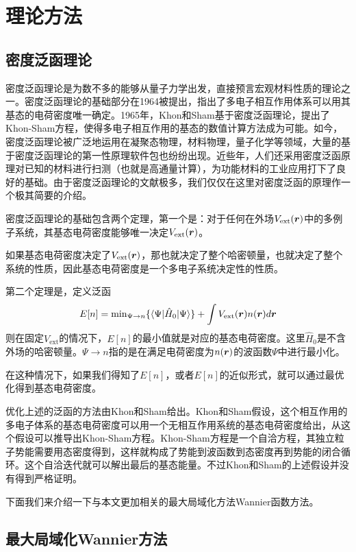 \chapter{理论方法}
\label{cha:method}

\section{密度泛函理论}

密度泛函理论是为数不多的能够从量子力学出发，直接预言宏观材料性质的理论之一。密度泛函理论的基础部分在1964被提出，指出了多电子相互作用体系可以用其基态的电荷密度唯一确定。1965年，Khon和Sham基于密度泛函理论，提出了Khon-Sham方程，使得多电子相互作用的基态的数值计算方法成为可能。如今，密度泛函理论被广泛地运用在凝聚态物理，材料物理，量子化学等领域，大量的基于密度泛函理论的第一性原理软件包也纷纷出现。近些年，人们还采用密度泛函原理对已知的材料进行扫测（也就是高通量计算），为功能材料的工业应用打下了良好的基础。由于密度泛函理论的文献极多，我们仅仅在这里对密度泛函的原理作一个极其简要的介绍。

密度泛函理论的基础包含两个定理，第一个是：对于任何在外场$V_{\text{ext}}(\boldsymbol{r})$中的多例子系统，其基态电荷密度能够唯一决定$V_{\text{ext}}(\boldsymbol{r})$。

如果基态电荷密度决定了$V_{\text{ext}}(\boldsymbol{r})$，那也就决定了整个哈密顿量，也就决定了整个系统的性质，因此基态电荷密度是一个多电子系统决定性的性质。

第二个定理是，定义泛函
\begin{equation}
    E[n] = \text{min}_{\Psi\to n} \{\langle\Psi|\hat{H}_0|\Psi\rangle\}+\int V_\text{ext}(\boldsymbol{r}) n(\boldsymbol{r}) d\boldsymbol{r}
\end{equation}
则在固定$V_\text{ext}$的情况下，$E[n]$的最小值就是对应的基态电荷密度。这里$\hat{H}_0$是不含外场的哈密顿量。$\Psi\to n$指的是在满足电荷密度为$n(\boldsymbol{r})$的波函数$\Psi$中进行最小化。

在这种情况下，如果我们得知了$E[n]$，或者$E[n]$的近似形式，就可以通过最优化得到基态电荷密度。

优化上述的泛函的方法由Khon和Sham给出。Khon和Sham假设，这个相互作用的多电子体系的基态电荷密度可以用一个无相互作用系统的基态电荷密度给出，从这个假设可以推导出Khon-Sham方程。Khon-Sham方程是一个自洽方程，其独立粒子势能需要用态密度得到，这样就构成了势能到波函数到态密度再到势能的闭合循环。这个自洽迭代就可以解出最后的基态能量。不过Khon和Sham的上述假设并没有得到严格证明。

下面我们来介绍一下与本文更加相关的最大局域化方法Wannier函数方法。

\section{最大局域化Wannier方法}
